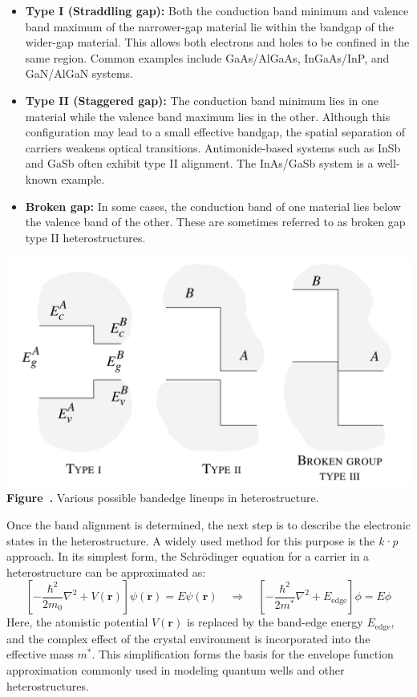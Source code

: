 \begin{itemize}
	\item \textbf{Type I (Straddling gap):} Both the conduction band minimum and valence band maximum of the narrower-gap material lie within the bandgap of the wider-gap material. This allows both electrons and holes to be confined in the same region. Common examples include GaAs/AlGaAs, InGaAs/InP, and GaN/AlGaN systems.
	\item \textbf{Type II (Staggered gap):} The conduction band minimum lies in one material while the valence band maximum lies in the other. Although this configuration may lead to a small effective bandgap, the spatial separation of carriers weakens optical transitions. Antimonide-based systems such as InSb and GaSb often exhibit type II alignment. The InAs/GaSb system is a well-known example.
	\item \textbf{Broken gap:} In some cases, the conduction band of one material lies below the valence band of the other. These are sometimes referred to as broken gap type II heterostructures.
\end{itemize}
\begin{center}
	\begin{minipage}{0.8\textwidth}
		\centering
		\includegraphics[width=\textwidth]{img/Bandledge_heterostructure.png}
		\\[0.5em]
		\textbf{Figure~\thefigure.} Various possible bandedge lineups in heterostructure.
		\label{fig:Bandledge_heterostructure}
	\end{minipage}
\end{center}
Once the band alignment is determined, the next step is to describe the electronic states in the heterostructure. A widely used method for this purpose is the \textit{k·p} approach. In its simplest form, the Schrödinger equation for a carrier in a heterostructure can be approximated as:
\begin{equation}
	\left[ -\frac{\hbar^2}{2 m_0} \nabla^2 + V(\mathbf{r}) \right] \psi(\mathbf{r}) = E \psi(\mathbf{r})
	\quad \Rightarrow \quad
	\left[ -\frac{\hbar^2}{2 m^*} \nabla^2 + E_{\text{edge}} \right] \phi = E \phi
\end{equation}
Here, the atomistic potential \( V(\mathbf{r}) \) is replaced by the band-edge energy \( E_{\text{edge}} \), and the complex effect of the crystal environment is incorporated into the effective mass \( m^* \). This simplification forms the basis for the envelope function approximation commonly used in modeling quantum wells and other heterostructures.


